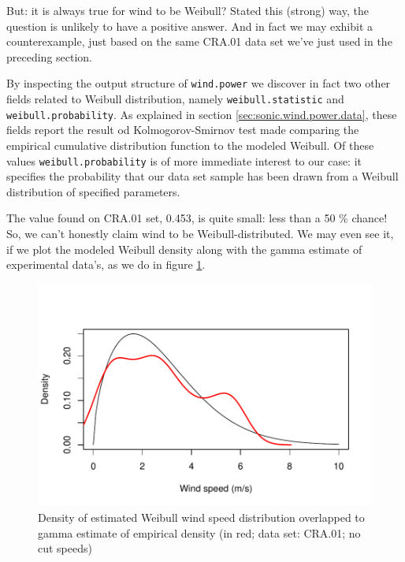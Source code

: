 \documentclass[a4paper,10pt]{book}
\begin{document}
But: it is always true for wind to be Weibull? Stated this (strong) way, the question is unlikely to have a positive answer. And in fact we may exhibit a counterexample, just based on the same CRA.01 data set we've just used in the preceding section.

By inspecting the output structure of \verb|wind.power| we discover in fact two other fields related to Weibull distribution, namely \verb|weibull.statistic| and \verb|weibull.probability|. As explained in section \ref{sec:sonic.wind.power.data}, these fields report the result od Kolmogorov-Smirnov test made comparing the empirical cumulative distribution function to the modeled Weibull. Of these values \verb|weibull.probability| is of more immediate interest to our case: it specifies the probability that our data set sample has been drawn from a Weibull distribution of specified parameters.

The value found on CRA.01 set, 0.453, is quite small: less than a 50 \% chance! So, we can't honestly claim wind to be Weibull-distributed. We may even see it, if we plot the modeled Weibull density along with the gamma estimate of experimental data's, as we do in figure \ref{fig:CRA01 Weibull and Experimental}.

\begin{figure}[htp]
 \centering
 \begin{center}
 \includegraphics[scale=0.80,keepaspectratio=true]{./diagrams/CRA01_Weibull_exper.pdf}
 \end{center}
 \caption{Density of estimated Weibull wind speed distribution overlapped to gamma estimate of empirical density (in red; data set: CRA.01; no cut speeds)}
 \label{fig:CRA01 Weibull and Experimental}
\end{figure}
\end{document}
